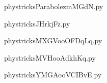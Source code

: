     

    \clearpage
    


    \newcommand{\CaptionFigParabolezmMGdN}{<+Type your caption here+>}
    \begin{center}
        
    \end{center}
    phystricksParabolezmMGdN.py

    

    \clearpage
    


    \newcommand{\CaptionFigJHrkjFz}{<+Type your caption here+>}
    \begin{center}
        
    \end{center}
    phystricksJHrkjFz.py

    

    \clearpage
    


    \newcommand{\CaptionFigMXGVooOFDqLq}{<+Type your caption here+>}
    \begin{center}
        
    \end{center}
    phystricksMXGVooOFDqLq.py

    

    \clearpage
    


    \newcommand{\CaptionFigMVHooAdkhKq}{<+Type your caption here+>}
    \begin{center}
        
    \end{center}
    phystricksMVHooAdkhKq.py

    

    \clearpage
    


    \newcommand{\CaptionFigYMGAooVCIBvE}{<+Type your caption here+>}
    \begin{center}
        
    \end{center}
    phystricksYMGAooVCIBvE.py

    

    \clearpage
    


